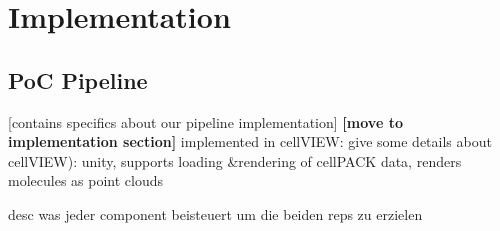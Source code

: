 \section{Implementation}


\subsection{PoC Pipeline}
[contains specifics about our pipeline implementation]\textbf{ [move to implementation section]}
implemented in cellVIEW: give some details about cellVIEW): unity, supports loading \&rendering of cellPACK data, renders molecules as point clouds
\newline

desc was jeder component beisteuert um die beiden reps zu erzielen